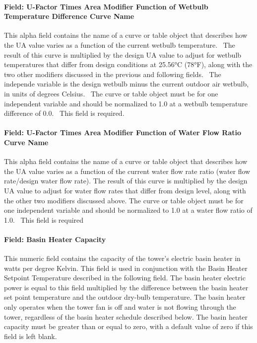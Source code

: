 \paragraph{Field: U-Factor Times Area Modifier Function of Wetbulb Temperature Difference Curve Name}\label{field-u-factor-times-area-modifier-function-of-wetbulb-temperature-difference-curve-name}

This alpha field contains the name of a curve or table object that describes how the UA value varies as a function of the current wetbulb temperature.~ The result of this curve is multiplied by the design UA value to adjust for wetbulb temperatures that differ from design conditions at 25.56°C (78°F), along with the two other modifiers discussed in the previous and following fields.~ The independe variable is the design wetbulb minus the current outdoor air wetbulb, in units of degrees Celsius.~ The curve or table object must be for one independent variable and should be normalized to 1.0 at a wetbulb temperature difference of 0.0.~ This field is required.

\paragraph{Field: U-Factor Times Area Modifier Function of Water Flow Ratio Curve Name}\label{field-u-factor-times-area-modifier-function-of-water-flow-ratio-curve-name}

This alpha field contains the name of a curve or table object that describes how the UA value varies as a function of the current water flow rate ratio (water flow rate/design water flow rate). The result of this curve is multiplied by the design UA value to adjust for water flow rates that differ from design level, along with the other two modifiers discussed above. The curve or table object must be for one independent variable and should be normalized to 1.0 at a water flow ratio of 1.0.~ This field is required

\paragraph{Field: Basin Heater Capacity}\label{field-basin-heater-capacity-2}

This numeric field contains the capacity of the tower's electric basin heater in watts per degree Kelvin. This field is used in conjunction with the Basin Heater Setpoint Temperature described in the following field. The basin heater electric power is equal to this field multiplied by the difference between the basin heater set point temperature and the outdoor dry-bulb temperature. The basin heater only operates when the tower fan is off and water is not flowing through the tower, regardless of the basin heater schedule described below. The basin heater capacity must be greater than or equal to zero, with a default value of zero if this field is left blank.


